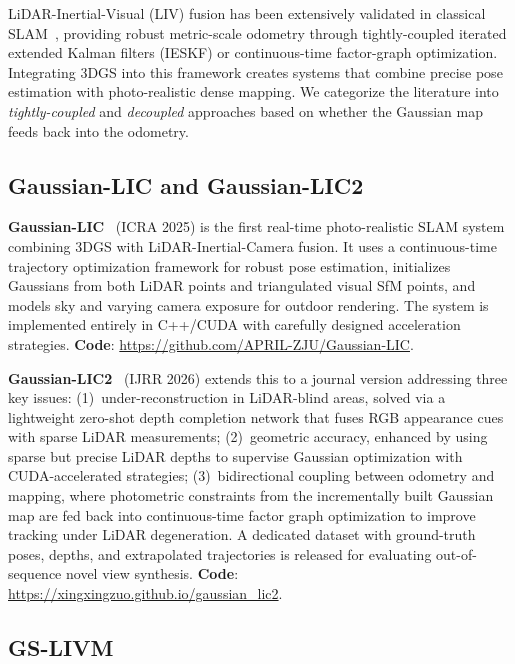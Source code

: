 LiDAR-Inertial-Visual (LIV) fusion has been extensively validated in
classical SLAM~\cite{xu2022fastlio2,zheng2024_fastlivo2,lin2024_r3live},
providing robust metric-scale odometry through tightly-coupled iterated
extended Kalman filters (IESKF) or continuous-time factor-graph optimization.
Integrating 3DGS into this framework creates systems that combine precise
pose estimation with photo-realistic dense mapping.  We categorize the
literature into \emph{tightly-coupled} and \emph{decoupled} approaches
based on whether the Gaussian map feeds back into the odometry.

\subsection{Gaussian-LIC and Gaussian-LIC2}

\textbf{Gaussian-LIC}~\cite{lang2025_gaussianlic} (ICRA 2025) is the first
real-time photo-realistic SLAM system combining 3DGS with
LiDAR-Inertial-Camera fusion.  It uses a continuous-time trajectory
optimization framework for robust pose estimation, initializes Gaussians
from both LiDAR points and triangulated visual SfM points, and models sky
and varying camera exposure for outdoor rendering.  The system is
implemented entirely in C++/CUDA with carefully designed acceleration
strategies.  \textbf{Code}: \url{https://github.com/APRIL-ZJU/Gaussian-LIC}.

\textbf{Gaussian-LIC2}~\cite{lang2026_gaussianlic2} (IJRR 2026) extends this
to a journal version addressing three key issues: (1)~under-reconstruction
in LiDAR-blind areas, solved via a lightweight zero-shot depth completion
network that fuses RGB appearance cues with sparse LiDAR measurements;
(2)~geometric accuracy, enhanced by using sparse but precise LiDAR depths to
supervise Gaussian optimization with CUDA-accelerated strategies;
(3)~bidirectional coupling between odometry and mapping, where photometric
constraints from the incrementally built Gaussian map are fed back into
continuous-time factor graph optimization to improve tracking under LiDAR
degeneration.  A dedicated dataset with ground-truth poses, depths, and
extrapolated trajectories is released for evaluating out-of-sequence novel
view synthesis.  \textbf{Code}: \url{https://xingxingzuo.github.io/gaussian_lic2}.

\subsection{GS-LIVM}

